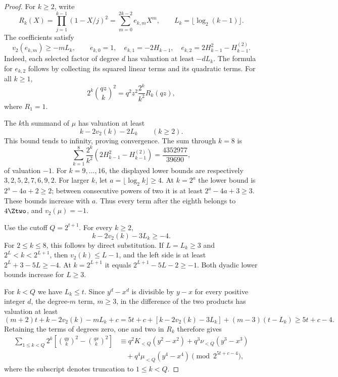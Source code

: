 \begin{proof}
For $k\ge2$, write
\[
 R_k(X)=\prod_{j=1}^{k-1}(1-X/j)^2
       =\sum_{m=0}^{2k-2}e_{k,m}X^m,
 \qquad L_k=\lfloor\log_2(k-1)\rfloor.
\]
The coefficients satisfy
\[
 v_2(e_{k,m})\ge-mL_k,\qquad
 e_{k,0}=1,\quad e_{k,1}=-2H_{k-1},\quad
 e_{k,2}=2H_{k-1}^2-H_{k-1}^{(2)}.
\]
Indeed, each selected factor of degree $d$ has valuation at least
$-dL_k$. The formula for $e_{k,2}$ follows by collecting its squared
linear terms and its quadratic terms. For all $k\ge1$,
\[
 2^k\binom{qz}{k}^2=q^2z^2\frac{2^k}{k^2}R_k(qz),
\]
where $R_1=1$.

The $k$th summand of $\mu$ has valuation at least
\[
 k-2v_2(k)-2L_k\qquad(k\ge2).
\]
This bound tends to infinity, proving convergence. The sum through
$k=8$ is
\[
 \sum_{k=1}^8\frac{2^k}{k^2}
       \left(2H_{k-1}^2-H_{k-1}^{(2)}\right)
       =\frac{4352977}{39690},
\]
of valuation $-1$. For $k=9,\ldots,16$, the displayed lower bounds
are respectively $3,2,5,2,7,6,9,2$.
For larger $k$, let $a=\lfloor\log_2k\rfloor\ge4$.
At $k=2^a$ the lower bound is $2^a-4a+2\ge2$;
between consecutive powers of two it is at least
$2^a-4a+3\ge3$. These bounds increase with $a$.
Thus every term after the eighth belongs to $4\Ztwo$, and
$v_2(\mu)=-1$.

Use the cutoff $Q=2^{t+1}$. For every $k\ge2$,
\begin{equation}\label{eq:quartic-degree-bound}
 k-2v_2(k)-3L_k\ge-4.
\end{equation}
For $2\le k\le8$, this follows by direct substitution.
If $L=L_k\ge3$ and $2^L<k<2^{L+1}$, then
$v_2(k)\le L-1$, and the left side is at least
$2^L+3-5L\ge-4$. At $k=2^{L+1}$ it equals
$2^{L+1}-5L-2\ge-1$. Both dyadic lower bounds increase for $L\ge3$.

For $k<Q$ we have $L_k\le t$. Since $y^d-x^d$ is divisible by
$y-x$ for every positive integer $d$, the degree-$m$ term, $m\ge3$,
in the difference of the two products has valuation at least
\[
 (m+2)t+k-2v_2(k)-mL_k+c
 =5t+c+[k-2v_2(k)-3L_k]+(m-3)(t-L_k)
 \ge5t+c-4.
\]
Retaining the terms of degrees zero, one and two in $R_k$ therefore gives
\begin{align*}
 \sum_{1\le k<Q}2^k
  \left[\binom{qy}{k}^2-\binom{qx}{k}^2\right]
 &\equiv q^2K_{<Q}(y^2-x^2)
       +q^3\nu_{<Q}(y^3-x^3)\\
 &\hspace{1em}+q^4\mu_{<Q}(y^4-x^4)
       \pmod{2^{5t+c-4}},
\end{align*}
where the subscript denotes truncation to $1\le k<Q$.


\end{proof}
